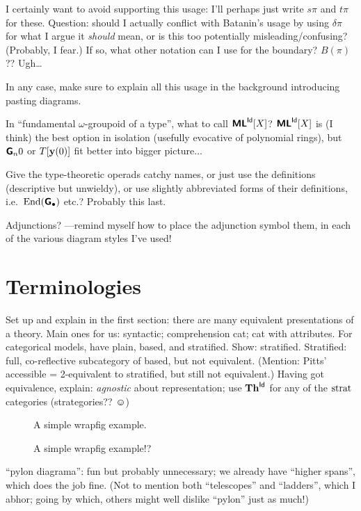 \documentclass{amsart}
\begin{document}
I certainly want to avoid supporting this usage: I'll perhaps just write $s\pi$ and $t\pi$ for these.  Question: should I actually conflict with Batanin's usage by using $\delta \pi$ for what I argue it \emph{should} mean, or is this too potentially misleading/confusing?  (Probably, I fear.)  If so, what other notation can I use for the boundary?  $B(\pi)$??  Ugh\ldots

In any case, make sure to explain all this usage in the background introducing pasting diagrams.

\para In ``fundamental $\omega$-groupoid of a type'', what to call $\textsf{\textbf{ML}}^{\mathsf{Id}}[X]$?  $\textsf{\textbf{ML}}^{\mathsf{Id}}[X]$ is (I think) the best option in isolation (usefully evocative of polynomial rings), but $\textsf{\textbf{G}}_{n}{0}$ or $\\T[\mathbf{y}(0)]$ fit better into bigger picture$\ldots$

\para Give the type-theoretic operads catchy names, or just use the definitions (descriptive but unwieldy), or use slightly abbreviated forms of their definitions, i.e.\ $\mathrm{End}(\textsf{\textbf{G}}_\bullet)$ etc.?  Probably this last.

\para Adjunctions? ---remind myself how to place the adjunction symbol them, in each of the various diagram styles I've used!

\section{Terminologies}

\para Set up and explain in the first section: there are many equivalent presentations of a theory.  Main ones for us: syntactic; comprehension cat; cat with attributes.  For categorical models, have plain, based, and stratified.  Show: stratified.  Stratified: full, co-reflective subcategory of based, but not equivalent.  (Mention: Pitts' accessible = 2-equivalent to stratified, but still not equivalent.)  Having got equivalence, explain: \emph{agnostic} about representation; use $\mathbf{Th}^{\mathsf{Id}}$ for any of the $\textrm{strat}$ categories (strategories?? $\smiley$)

\begin{wrapfigure}{r}{0.4\textwidth}
A simple wrapfig example.
\caption{A simple wrapfig example!?}
\end{wrapfigure}

\para ``pylon diagrama'': fun but probably unnecessary; we already have ``higher spans'', which does the job fine. (Not to mention both ``telescopes'' and ``ladders'', which I abhor; going by which, others might well dislike ``pylon'' just as much!)
\end{document}
